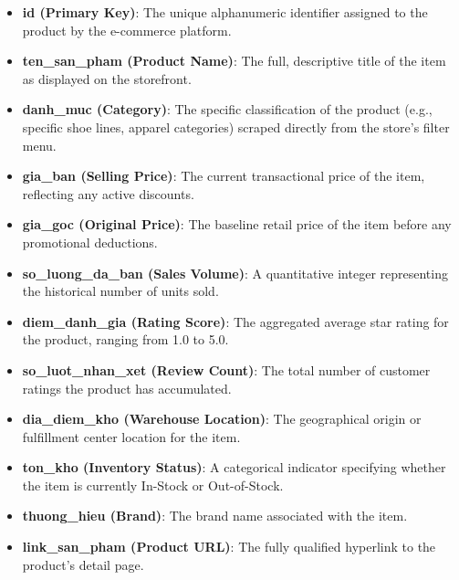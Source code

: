         \begin{itemize}
            \item \textbf{id (Primary Key)}: The unique alphanumeric identifier assigned to the product by the e-commerce platform.
            \item \textbf{ten\_san\_pham (Product Name)}: The full, descriptive title of the item as displayed on the storefront.
            \item \textbf{danh\_muc (Category)}: The specific classification of the product (e.g., specific shoe lines, apparel categories) scraped directly from the store's filter menu.
            \item \textbf{gia\_ban (Selling Price)}: The current transactional price of the item, reflecting any active discounts.
            \item \textbf{gia\_goc (Original Price)}: The baseline retail price of the item before any promotional deductions.
            \item \textbf{so\_luong\_da\_ban (Sales Volume)}: A quantitative integer representing the historical number of units sold.
            \item \textbf{diem\_danh\_gia (Rating Score)}: The aggregated average star rating for the product, ranging from 1.0 to 5.0.
            \item \textbf{so\_luot\_nhan\_xet (Review Count)}: The total number of customer ratings the product has accumulated.
            \item \textbf{dia\_diem\_kho (Warehouse Location)}: The geographical origin or fulfillment center location for the item.
            \item \textbf{ton\_kho (Inventory Status)}: A categorical indicator specifying whether the item is currently In-Stock or Out-of-Stock.
            \item \textbf{thuong\_hieu (Brand)}: The brand name associated with the item.
            \item \textbf{link\_san\_pham (Product URL)}: The fully qualified hyperlink to the product's detail page.
        \end{itemize}

